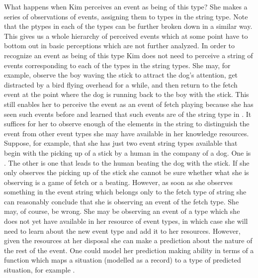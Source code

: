 What happens when Kim perceives an event as being of this type?  She
makes a series of observations of events, assigning them to types in
the string type.  Note that the ptypes in each of the types can be
further broken down in a similar way.  This gives us a whole hierarchy
of perceived events which at some point have to bottom out in basic
perceptions which are not further analyzed.  In order to recognize an
event as being of this type Kim does not need to perceive a string of
events corresponding to each of the types in the string types.  She
may, for example, observe the boy waving the stick to attract the
dog's attention, get distracted by a bird flying overhead for a while,
and then return to the fetch event at the point where the dog is
running back to the boy with the stick.  This still enables her to
perceive the event as an event of fetch playing because she has seen
such events before and learned that such events are of the string type in \preveg{}.  It suffices for her to observe enough of the elements in
the string to distinguish the event from other event types she may
have available in her knowledge resources.  Suppose, for example, that
she has just two event string types available that begin with the picking
up of a stick by a human in the company of a dog.  One is \preveg{}.
The other is one that leads to the human beating the dog with the
stick.  If she only observes the picking up of the stick she cannot be
sure whether what she is observing is a game of fetch or a beating.
However, as soon as she observes something in the event string which
belongs only to the fetch type of string she can reasonably conclude
that she is observing an event of the fetch type.  She may, of course,
be wrong.  She may be observing an event of a type which she does not
yet have available in her resource of event types, in which case she
will need to learn about the new event type and add it to her
resources.  However, given the resources at her disposal she can make
a prediction about the nature of the rest of the event.  One could
model her prediction making ability in terms of a function which maps
a situation (modelled as a record) to a type of predicted situation,
for example \nexteg{}.
